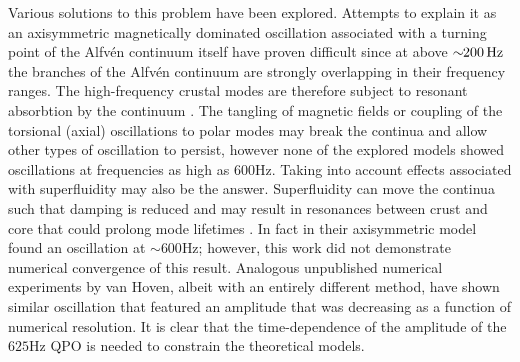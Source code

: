 \documentclass{emulateapj}
\begin{document}
Various solutions to this problem have been explored. Attempts to explain it as an axisymmetric magnetically dominated oscillation associated with a turning point of the Alfv\'en continuum itself have proven difficult since at above $\sim\!\! 200\,\mathrm{Hz}$ the branches of the Alfv\'en continuum are strongly overlapping in their frequency ranges.  The high-frequency crustal modes are therefore subject to resonant absorbtion by the continuum \citep{vanHoven11, vanHoven12}. The tangling of magnetic fields \citep{vanHoven11}  or coupling of the torsional (axial) oscillations to polar modes \citep{Colaiuda12,Lander10,Lander11} may break the continua and allow other types of oscillation to persist,
however none of the explored models showed oscillations at frequencies as high as $600$Hz. Taking into account effects associated with superfluidity may also be the answer. Superfluidity can move the continua such that damping is reduced \citep{vanHoven08, Andersson09, Passamonti13a} and may result in resonances between crust and core that could prolong mode lifetimes \citep{Gabler13, Passamonti13b}.  In fact in their axisymmetric model \citep{Gabler13} found an oscillation at $\sim 600$Hz; however, this work
did not demonstrate  numerical convergence of this result. Analogous unpublished numerical experiments
by van Hoven, albeit with an entirely different method, have shown similar oscillation that featured an amplitude that was decreasing as a function of numerical resolution.
It is clear that the time-dependence of the amplitude of the $625$Hz QPO is needed
to constrain the theoretical models.
\end{document}
